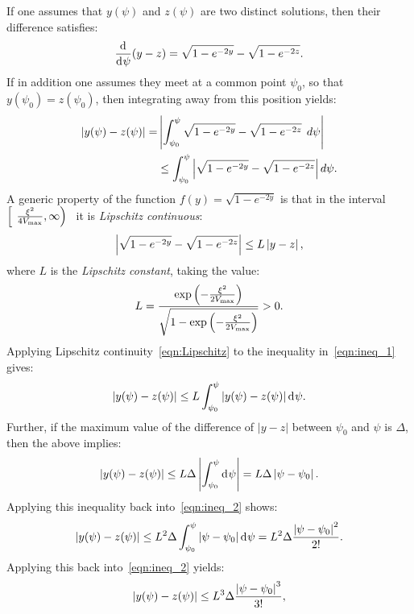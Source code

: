 If one assumes that \(y(\psi)\) and \(z(\psi)\) are two distinct solutions, then their difference satisfies:
\begin{equation}
  \frac{\operatorname{d}^{}\!{}}{\operatorname{d}^{}\!{\psi}}(y-z)
  =
  \sqrt{1-e^{-2y}} - \sqrt{1-e^{-2z}}.
  \label{eqn:master_diff}
\end{equation}
If in addition one assumes they meet at a common point \(\psi_0\), so that \(y(\psi_0)=z(\psi_0)\), then integrating away from this position yields:
\begin{align}
  \left|y(\psi)-z(\psi)\right|
  =&
  \left|\int_{\psi_0}^\psi \sqrt{1-e^{-2y}}
  - \sqrt{1-e^{-2z}}\:\:d\psi\right|
  \nonumber\\
  &
  \le \int_{\psi_0}^\psi \left|\sqrt{1-e^{-2y}}
  - \sqrt{1-e^{-2z}}\right|d\psi.
  \label{eqn:ineq_1}
\end{align}
A generic property of the function \(f(y)=\sqrt{1-e^{-2y}}\) is that in the interval \(\left[\phantom(\frac{\vellim^2}{4\Vm},\infty\right)\phantom]\) it is {\em Lipschitz continuous\/}:
\begin{equation}
  \left|\sqrt{1-e^{-2y}} - \sqrt{1-e^{-2z}}\right| \le L\left|y-z\right|,
  \label{eqn:Lipschitz}
\end{equation}
where \(L\) is the {\em Lipschitz constant}, taking the value:
\begin{equation}
  L
  = 
  \frac{\exp{\left(-\frac{\xi^2}{2V_\mathrm{max}}\right)}}
  {\sqrt{1-\exp{\left(-\frac{\xi^2}{2V_\mathrm{max}}\right)}}} 
  > 0.
\end{equation}
Applying Lipschitz continuity~\eqref{eqn:Lipschitz} to the inequality in~\eqref{eqn:ineq_1} gives:
\begin{equation}
  \left|y(\psi)-z(\psi)\right| 
  \le
  L\int_{\psi_0}^\psi\left|y(\psi)-z(\psi)\right|\operatorname{d}^{}\!{\psi}.
  \label{eqn:ineq_2}
\end{equation}
Further, if the maximum value of the difference of \(|y-z|\) between \(\psi_0\) and \(\psi\) is \(\Delta\), then the above implies:
\begin{equation}
  \left|y(\psi)-z(\psi)\right| 
  \le
  L\Delta\left|\int_{\psi_0}^\psi \operatorname{d}^{}\!{\psi}\right|= 
  L\Delta\left|\psi-\psi_0\right|.
\end{equation}
Applying this inequality back into~\eqref{eqn:ineq_2} shows:
\begin{equation}
  \left|y(\psi)-z(\psi)\right| 
  \le
  L^2\Delta\int_{\psi_0}^\psi\left|\psi-\psi_0\right|\operatorname{d}^{}\!{\psi} =
  L^2\Delta\frac{\left|\psi-\psi_0\right|^2}{2!}.
\end{equation}
Applying this back into~\eqref{eqn:ineq_2} yields:
\begin{equation}
  \left|y(\psi)-z(\psi)\right| 
  \le
  L^3\Delta\frac{\left|\psi-\psi_0\right|^3}{3!},
\end{equation}

